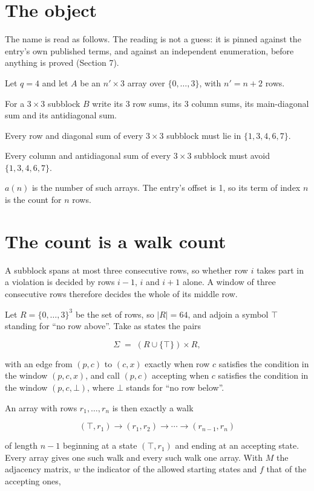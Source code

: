\documentclass[11pt]{article}
\theoremstyle{definition}
\begin{document}
\section{The object}

The name is read as follows. The reading is not a guess: it is pinned against the entry's own published terms, and against an independent enumeration, before anything is proved (Section 7).

Let $q = 4$ and let $A$ be an $n' \times 3$ array over $\{0,\dots,3\}$, with $n' = n + 2$ rows.

For a $3\times3$ subblock $B$ write its 3 row sums, its 3 column sums, its main-diagonal sum and its antidiagonal sum.

Every row and diagonal sum of every $3\times3$ subblock must lie in $\{1, 3, 4, 6, 7\}$.

Every column and antidiagonal sum of every $3\times3$ subblock must avoid $\{1, 3, 4, 6, 7\}$.

$a(n)$ is the number of such arrays. The entry's offset is 1, so its term of index $n$ is the count for $n$ rows.

\section{The count is a walk count}

A subblock spans at most three consecutive rows, so whether row $i$ takes part in a violation is decided by rows $i-1$, $i$ and $i+1$ alone. A window of three consecutive rows therefore decides the whole of its middle row.

Let $R = \{0,\dots,3\}^{3}$ be the set of rows, so $|R| = 64$, and adjoin a symbol $\top$ standing for ``no row above''. Take as states the pairs

\[\Sigma \;=\; (R \cup \{\top\}) \times R,\]

with an edge from $(p,c)$ to $(c,x)$ exactly when row $c$ satisfies the condition in the window $(p,c,x)$, and call $(p,c)$ accepting when $c$ satisfies the condition in the window $(p,c,\bot)$, where $\bot$ stands for ``no row below''.

An array with rows $r_1,\dots,r_n$ is then exactly a walk

\[(\top,r_1) \to (r_1,r_2) \to \cdots \to (r_{n-1},r_n)\]

of length $n-1$ beginning at a state $(\top,r_1)$ and ending at an accepting state. Every array gives one such walk and every such walk one array. With $M$ the adjacency matrix, $w$ the indicator of the allowed starting states and $f$ that of the accepting ones,
\end{document}
